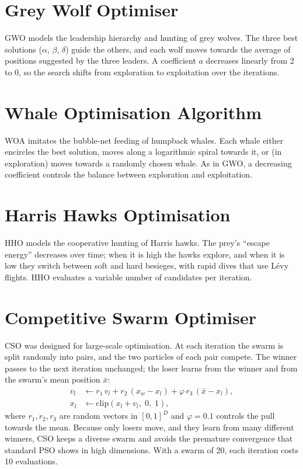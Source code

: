 \documentclass[12pt,a4paper]{report}
\begin{document}
\section{Grey Wolf Optimiser}
GWO \cite{mirjalili2014} models the leadership hierarchy and hunting of grey wolves. The three best solutions
($\alpha$, $\beta$, $\delta$) guide the others, and each wolf moves towards the average of positions suggested by
the three leaders. A coefficient $a$ decreases linearly from 2 to 0, so the search shifts from exploration to
exploitation over the iterations.

\section{Whale Optimisation Algorithm}
WOA \cite{mirjalili2016} imitates the bubble-net feeding of humpback whales. Each whale either encircles the best
solution, moves along a logarithmic spiral towards it, or (in exploration) moves towards a randomly chosen whale. As
in GWO, a decreasing coefficient controls the balance between exploration and exploitation.

\section{Harris Hawks Optimisation}
HHO \cite{heidari2019} models the cooperative hunting of Harris hawks. The prey's ``escape energy'' decreases over
time; when it is high the hawks explore, and when it is low they switch between soft and hard besieges, with rapid
dives that use L\'evy flights. HHO evaluates a variable number of candidates per iteration.

\section{Competitive Swarm Optimiser}
CSO \cite{cheng2015} was designed for large-scale optimisation. At each iteration the swarm is split randomly into
pairs, and the two particles of each pair compete. The winner passes to the next iteration unchanged; the loser
learns from the winner and from the swarm's mean position $\bar{x}$:
\begin{align}
v_{l} &\leftarrow r_1\, v_{l} + r_2\,(x_{w} - x_{l}) + \varphi\, r_3\,(\bar{x} - x_{l}), \\
x_{l} &\leftarrow \mathrm{clip}\!\left(x_{l} + v_{l},\; 0,\; 1\right),
\end{align}
where $r_1, r_2, r_3$ are random vectors in $[0,1]^D$ and $\varphi = 0.1$ controls the pull towards the mean.
Because only losers move, and they learn from many different winners, CSO keeps a diverse swarm and avoids the
premature convergence that standard PSO shows in high dimensions. With a swarm of 20, each iteration costs 10
evaluations.
\end{document}
